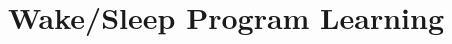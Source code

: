 \documentclass[12pt]{article}
\begin{document}








\section*{Wake/Sleep Program Learning}\label{overviewSection}
\end{document}
